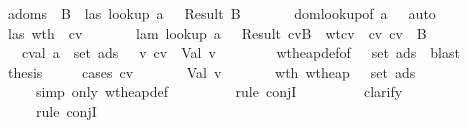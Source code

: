 \begin{isabellebody}
\ \ \ \ \isamarkupfalse \ adoms\ \isamarkupfalse \ B\ \ las{\isacharcolon}\ {\isachardoublequoteopen}lookup\ a\ {\isasymSigma}\ {\isacharequal}\ Result\ B{\isachardoublequoteclose}\isanewline
\ \ \ \ \ \ \isamarkupfalse \ dom{\isacharunderscore}lookup{\isacharbrackleft}of\ a\ {\isasymSigma}{\isacharbrackright}\ \isamarkupfalse \ auto\isanewline
\ \ \ \ \isamarkupfalse \ las\ wt{\isacharunderscore}h\ \isamarkupfalse \ cv\ \isanewline
\ \ \ \ \ \ lam{\isacharcolon}\ {\isachardoublequoteopen}lookup\ a\ {\isasymmu}\ {\isacharequal}\ Result\ {\isacharparenleft}cv{\isacharcomma}B{\isacharparenright}{\isachardoublequoteclose}\ \ wtcv{\isacharcolon}\ {\isachardoublequoteopen}{\isasymSigma}\ {\isasymturnstile}cv\ cv\ {\isacharcolon}\ B{\isachardoublequoteclose}\ \isanewline
\ \ \ \ \ \ \ cval{\isacharcolon}\ {\isachardoublequoteopen}a\ {\isasymnotin}\ {\isacharparenleft}set\ ads{\isacharparenright}\ {\isasymlongrightarrow}\ {\isacharparenleft}{\isasymexists}\ v{\isachardot}\ cv\ {\isacharequal}\ Val\ v{\isacharparenright}{\isachardoublequoteclose}\ \isanewline
\ \ \ \ \ \ \isamarkupfalse \ wt{\isacharunderscore}heap{\isacharunderscore}def{\isacharbrackleft}of\ {\isasymSigma}\ {\isasymmu}\ {\isachardoublequoteopen}set\ ads{\isachardoublequoteclose}{\isacharbrackright}\ \isamarkupfalse \ blast\ \isamarkupfalse \isanewline
\ \ \ \ \isamarkupfalse \ {\isacharquery}thesis\isanewline
\ \ \ \ \isamarkupfalse \ {\isacharparenleft}cases\ cv{\isacharparenright}\isanewline
\ \ \ \ \ \ \isamarkupfalse \ {\isacharparenleft}Val\ v{\isacharparenright}\isanewline
\ \ \ \ \ \ \isamarkupfalse \ wth{}{\isacharcolon}\ {\isachardoublequoteopen}wt{\isacharunderscore}heap\ {\isasymSigma}\ {\isasymmu}\ {\isacharparenleft}set\ ads{\isacharprime}{\isacharparenright}{\isachardoublequoteclose}\isanewline
\ \ \ \ \ \ \ \ \isamarkupfalse \ {\isacharparenleft}simp\ only{\isacharcolon}\ wt{\isacharunderscore}heap{\isacharunderscore}def{\isacharparenright}\isanewline
\ \ \ \ \ \ \ \ \isamarkupfalse \ {\isacharparenleft}rule\ conjI{\isacharparenright}\isanewline
\ \ \ \ \ \ \ \ \isamarkupfalse \ clarify\ \isamarkupfalse \ \isanewline
\ \ \ \ \ \ \ \ \isamarkupfalse \ {\isacharparenleft}rule\ conjI{\isacharparenright}\isanewline

\end{isabellebody}
